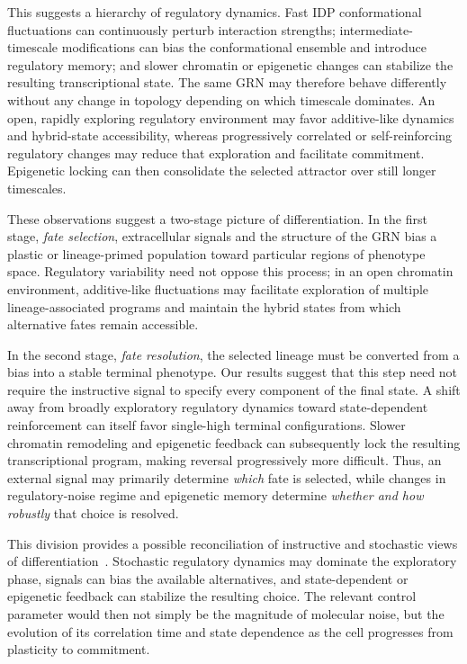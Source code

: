 \documentclass[11pt]{article}
\begin{document}
This suggests a hierarchy of regulatory dynamics. Fast IDP conformational fluctuations can continuously perturb interaction strengths; intermediate-timescale modifications can bias the conformational ensemble and introduce regulatory memory; and slower chromatin or epigenetic changes can stabilize the resulting transcriptional state. The same GRN may therefore behave differently without any change in topology depending on which timescale dominates. An open, rapidly exploring regulatory environment may favor additive-like dynamics and hybrid-state accessibility, whereas progressively correlated or self-reinforcing regulatory changes may reduce that exploration and facilitate commitment. Epigenetic locking can then consolidate the selected attractor over still longer timescales.

These observations suggest a two-stage picture of differentiation. In the first stage, \emph{fate selection}, extracellular signals and the structure of the GRN bias a plastic or lineage-primed population toward particular regions of phenotype space. Regulatory variability need not oppose this process; in an open chromatin environment, additive-like fluctuations may facilitate exploration of multiple lineage-associated programs and maintain the hybrid states from which alternative fates remain accessible.

In the second stage, \emph{fate resolution}, the selected lineage must be converted from a bias into a stable terminal phenotype. Our results suggest that this step need not require the instructive signal to specify every component of the final state. A shift away from broadly exploratory regulatory dynamics toward state-dependent reinforcement can itself favor single-high terminal configurations. Slower chromatin remodeling and epigenetic feedback can subsequently lock the resulting transcriptional program, making reversal progressively more difficult. Thus, an external signal may primarily determine \emph{which} fate is selected, while changes in regulatory-noise regime and epigenetic memory determine \emph{whether and how robustly} that choice is resolved.

This division provides a possible reconciliation of instructive and stochastic views of differentiation~\cite{Enver1998DoDice, Safina2024NewGenomics}. Stochastic regulatory dynamics may dominate the exploratory phase, signals can bias the available alternatives, and state-dependent or epigenetic feedback can stabilize the resulting choice. The relevant control parameter would then not simply be the magnitude of molecular noise, but the evolution of its correlation time and state dependence as the cell progresses from plasticity to commitment.
\end{document}

